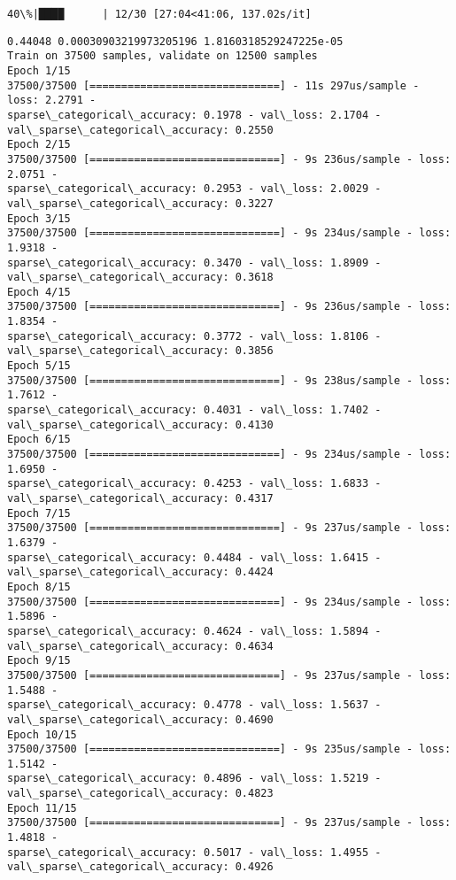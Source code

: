 \documentclass[11pt]{article}
\begin{document}
    \begin{Verbatim}[commandchars=\\\{\}]
 40\%|████      | 12/30 [27:04<41:06, 137.02s/it]
    \end{Verbatim}

    \begin{Verbatim}[commandchars=\\\{\}]
0.44048 0.00030903219973205196 1.8160318529247225e-05
Train on 37500 samples, validate on 12500 samples
Epoch 1/15
37500/37500 [==============================] - 11s 297us/sample - loss: 2.2791 -
sparse\_categorical\_accuracy: 0.1978 - val\_loss: 2.1704 -
val\_sparse\_categorical\_accuracy: 0.2550
Epoch 2/15
37500/37500 [==============================] - 9s 236us/sample - loss: 2.0751 -
sparse\_categorical\_accuracy: 0.2953 - val\_loss: 2.0029 -
val\_sparse\_categorical\_accuracy: 0.3227
Epoch 3/15
37500/37500 [==============================] - 9s 234us/sample - loss: 1.9318 -
sparse\_categorical\_accuracy: 0.3470 - val\_loss: 1.8909 -
val\_sparse\_categorical\_accuracy: 0.3618
Epoch 4/15
37500/37500 [==============================] - 9s 236us/sample - loss: 1.8354 -
sparse\_categorical\_accuracy: 0.3772 - val\_loss: 1.8106 -
val\_sparse\_categorical\_accuracy: 0.3856
Epoch 5/15
37500/37500 [==============================] - 9s 238us/sample - loss: 1.7612 -
sparse\_categorical\_accuracy: 0.4031 - val\_loss: 1.7402 -
val\_sparse\_categorical\_accuracy: 0.4130
Epoch 6/15
37500/37500 [==============================] - 9s 234us/sample - loss: 1.6950 -
sparse\_categorical\_accuracy: 0.4253 - val\_loss: 1.6833 -
val\_sparse\_categorical\_accuracy: 0.4317
Epoch 7/15
37500/37500 [==============================] - 9s 237us/sample - loss: 1.6379 -
sparse\_categorical\_accuracy: 0.4484 - val\_loss: 1.6415 -
val\_sparse\_categorical\_accuracy: 0.4424
Epoch 8/15
37500/37500 [==============================] - 9s 234us/sample - loss: 1.5896 -
sparse\_categorical\_accuracy: 0.4624 - val\_loss: 1.5894 -
val\_sparse\_categorical\_accuracy: 0.4634
Epoch 9/15
37500/37500 [==============================] - 9s 237us/sample - loss: 1.5488 -
sparse\_categorical\_accuracy: 0.4778 - val\_loss: 1.5637 -
val\_sparse\_categorical\_accuracy: 0.4690
Epoch 10/15
37500/37500 [==============================] - 9s 235us/sample - loss: 1.5142 -
sparse\_categorical\_accuracy: 0.4896 - val\_loss: 1.5219 -
val\_sparse\_categorical\_accuracy: 0.4823
Epoch 11/15
37500/37500 [==============================] - 9s 237us/sample - loss: 1.4818 -
sparse\_categorical\_accuracy: 0.5017 - val\_loss: 1.4955 -
val\_sparse\_categorical\_accuracy: 0.4926

\end{Verbatim}
\end{document}
